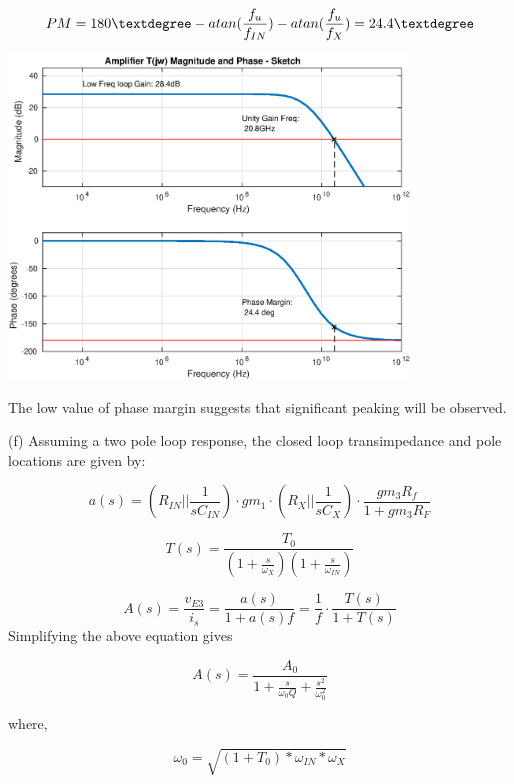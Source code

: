 \documentclass[12pt,a4paper]{article}
\begin{document}
\begin{equation}
  PM = 180\textdegree  - atan(\frac{f_u}{f_{IN}}) - atan(\frac{f_u}{f_{X}}) = 24.4\textdegree
\end{equation}

{\centering
	\includegraphics[width=0.8\textwidth]{plots/part_e.eps}
\par}

The low value of phase margin suggests that significant peaking will be observed.

\newpage
(f) Assuming a two pole loop response, the closed loop transimpedance and pole locations are given by:

\begin{equation}
  a(s) = (R_{IN} || \frac{1}{sC_{IN}}) \cdot gm_1 \cdot (R_X || \frac{1}{sC_X}) \cdot \frac{gm_3 R_f}{1 + gm_3 R_F}
\end{equation}

\begin{equation}
  T(s) = \frac{T_{0}}{(1 + \frac{s}{\omega_X})(1+\frac{s}{\omega_{IN}})}
\end{equation}

\begin{equation}
  A(s) = \frac{v_{E3}}{i_s} = \frac{a(s)}{1 + a(s) f} = \frac{1}{f} \cdot \frac{T(s)}{1 + T(s)}
\end{equation}
Simplifying the above equation gives

\begin{equation}
  A(s) = \frac{A_0}{1 + \frac{s}{\omega_0 Q} + \frac{s^{2}}{\omega_0^{2}}} 
\end{equation}
 
where,

\begin{equation}
  \omega_{0} = \sqrt{(1+T_0) * \omega_{IN} * \omega_{X}} 
\end{equation}
\end{document}
